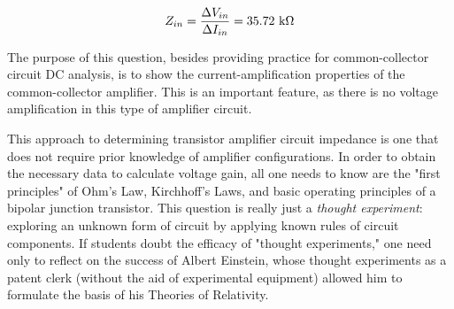 $$Z_{in} = {\Delta V_{in} \over \Delta I_{in}} = 35.72 \hbox{ k}\Omega$$







The purpose of this question, besides providing practice for common-collector circuit DC analysis, is to show the current-amplification properties of the common-collector amplifier.  This is an important feature, as there is no voltage amplification in this type of amplifier circuit.

This approach to determining transistor amplifier circuit impedance is one that does not require prior knowledge of amplifier configurations.  In order to obtain the necessary data to calculate voltage gain, all one needs to know are the "first principles" of Ohm's Law, Kirchhoff's Laws, and basic operating principles of a bipolar junction transistor.  This question is really just a {\it thought experiment}: exploring an unknown form of circuit by applying known rules of circuit components.  If students doubt the efficacy of "thought experiments," one need only to reflect on the success of Albert Einstein, whose thought experiments as a patent clerk (without the aid of experimental equipment) allowed him to formulate the basis of his Theories of Relativity.




